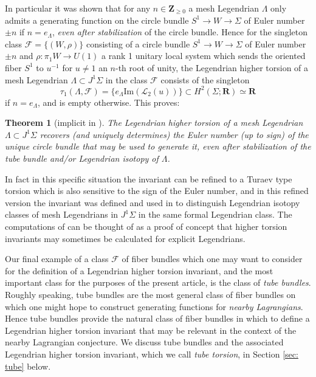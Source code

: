 \documentclass{amsart}
\newcommand\cF{\mathcal{F}}
\def\bR{\mathbf{R}}
\def\bZ{\mathbf{Z}}
\newtheorem{theorem}{Theorem}[section]
\theoremstyle{definition}
\theoremstyle{remark}
\newtheorem{inductive lemma}[theorem]{Inductive Lemma}
\begin{document}
In particular it was shown that for any $n \in \bZ_{\geq 0}$ a mesh Legendrian $\Lambda$ only admits a generating function on the circle bundle $S^1 \to W \to \Sigma$ of Euler number $\pm n$ if $n=e_\Lambda$, {\em even after stabilization} of the circle bundle. Hence for  the singleton class $\cF=\{(W,\rho)\}$ consisting of a circle bundle  $S^1 \to W \to \Sigma$ of Euler number $\pm n$ and  $\rho : \pi_1 W \to U(1)$  a rank 1 unitary local system which sends the oriented fiber $S^1$ to $u^{-1}$ for $u \neq 1$ an $n$-th root of unity, the Legendrian higher torsion of a mesh Legendrian $\Lambda \subset J^1 \Sigma$ in the class $\cF$ consists of the singleton
 $$\tau_1(\Lambda,\cF)=\{ e_\Lambda \text{Im}( \mathcal{L}_2(u))  \} \subset H^2(\Sigma;\bR) \simeq \bR$$
 if $n=e_\Lambda$, and is empty otherwise. This proves:
 \begin{theorem}[implicit in \cite{AI}] The Legendrian higher torsion of a mesh Legendrian $\Lambda \subset J^1 \Sigma$ recovers (and uniquely determines) the Euler number (up to sign) of the unique circle bundle that may be used to generate it, even after stabilization of the tube bundle and/or Legendrian isotopy of $\Lambda$.  \end{theorem}

In fact in this specific situation the invariant can be refined to a Turaev type torsion which  is also sensitive to the sign of the Euler number,  and in this refined version the invariant was defined and used in \cite{AI} to distinguish Legendrian isotopy classes of mesh Legendrians in $J^1\Sigma$ in the same formal Legendrian class. The computations of \cite{AI} can be thought of as a proof of concept that higher torsion invariants may sometimes be calculated for explicit Legendrians. 

Our final example of a class $\cF$ of fiber bundles which one may want to consider for the definition of a Legendrian higher torsion invariant, and the most important class for the purposes of the present article, is the class of {\em tube bundles}. Roughly speaking, tube bundles are the most general class of fiber bundles on which one might hope to construct generating functions for {\em nearby Lagrangians}. Hence tube bundles provide the natural class of fiber bundles in which to define a Legendrian higher torsion invariant that may be relevant in the context of the  nearby Lagrangian conjecture. We discuss tube bundles and the associated Legendrian higher torsion invariant, which we call {\em tube torsion}, in Section \ref{sec: tube} below.
\end{document}
